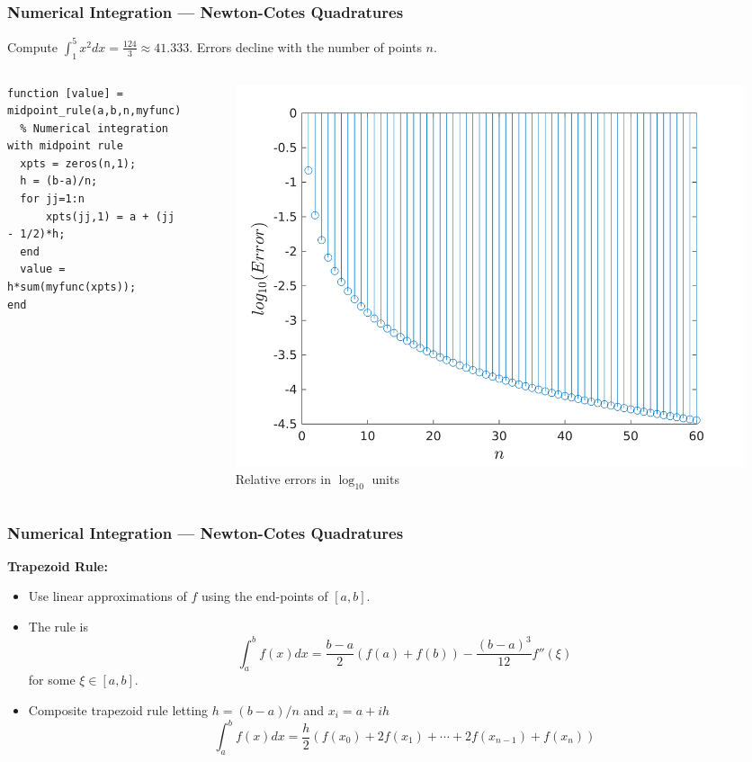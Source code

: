 \documentclass[11pt,xcolor={svgnames},aspectratio=169,usepdftitle=false]{beamer}
\begin{document}
\begin{frame}[fragile]
  \frametitle{Numerical Integration --- Newton-Cotes Quadratures}
\begin{example}
Compute $\int^5_1 x^2 dx = \frac{124}{3}\approx 41.333$. Errors decline with the number of points $n$.
\end{example}
\begin{columns}
\begin{column}{0.45\textwidth}
\begin{lstlisting}[basicstyle=\footnotesize\ttfamily]
function [value] = midpoint_rule(a,b,n,myfunc)
  % Numerical integration with midpoint rule
  xpts = zeros(n,1);
  h = (b-a)/n;
  for jj=1:n 
      xpts(jj,1) = a + (jj - 1/2)*h;
  end
  value = h*sum(myfunc(xpts));
end
\end{lstlisting}
\end{column}
\begin{column}{0.5\textwidth}
  \begin{figure}
    \centering
    \includegraphics[width=\textwidth]{../figures/errors_midpointrule.png}
    \caption{Relative errors in $\log_{10}$ units}
  \end{figure}
\end{column}
\end{columns}
\end{frame}

\begin{frame}
  \frametitle{Numerical Integration --- Newton-Cotes Quadratures}
  \alert{\textbf{Trapezoid Rule:}}
\begin{itemize}
  \item Use linear approximations of $f$ using the end-points of $[a,b]$.
  \item The rule is
  \[
  \int^b_a f(x)  dx = \frac{b-a}{2}(f(a) + f(b)) - \frac{(b - a)^3}{12}f''(\xi)
  \]
  for some $\xi\in [a,b]$.
  \item Composite trapezoid rule letting $h = (b-a)/n$ and $x_i = a + ih$
  \[
  \int^b_a f(x)dx = \frac{h}{2}\left(f(x_0) + 2f(x_1) + \cdots + 2f(x_{n-1}) + f(x_n)\right)
  \]
\end{itemize}
\end{frame}
\end{document}
